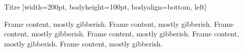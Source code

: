 \documentclass[9pt]{beamer}
\begin{document}
\begin{frame}

  \begin{block}{Titre}
    [width=200pt, bodyheight=100pt, bodyalign={bottom, left}]

    Frame content, mostly gibberish. Frame content, mostly gibberish.
    Frame content, mostly gibberish. Frame content, mostly gibberish.
    Frame content, mostly gibberish. Frame content, mostly gibberish.
  \end{block}

\end{frame}
\end{document}
